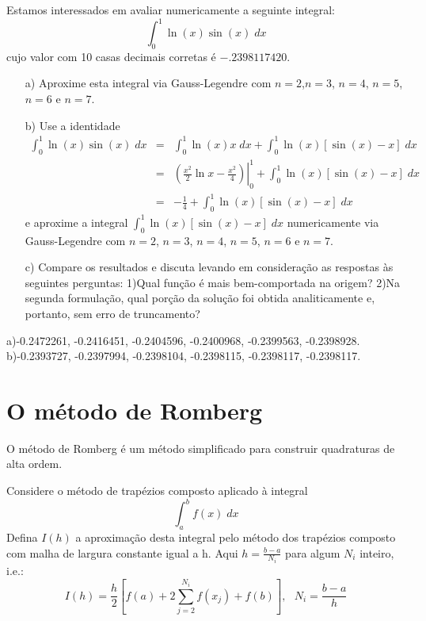 \begin{exer}
Estamos interessados em avaliar numericamente a seguinte integral:
$$\int_0^1 \ln(x)\sin(x)\;dx$$
cujo valor com 10 casas decimais corretas é $-.2398117420$.
\begin{itemize}
\item[a)] Aproxime esta integral via Gauss-Legendre com $n=2$,$n=3$, $n=4$, $n=5$, $n=6$ e $n=7$.
\item[b)] Use a identidade
\begin{eqnarray*}
\int_0^1 \ln(x)\sin(x)\;dx&=&\int_0^1 \ln(x)x\;dx+\int_0^1 \ln(x)\left[\sin(x)-x\right]\;dx\\
&=&\left.\left(\frac{x^2}{2}\ln x-\frac{x^2}{4}\right)\right|_0^1+\int_0^1 \ln(x)\left[\sin(x)-x\right]\;dx\\
&=&-\frac{1}{4}+\int_0^1 \ln(x)\left[\sin(x)-x\right]\;dx
\end{eqnarray*}
e aproxime a integral $\int_0^1 \ln(x)\left[\sin(x)-x\right]\;dx$ numericamente via Gauss-Legendre com $n=2$, $n=3$, $n=4$, $n=5$, $n=6$ e $n=7$.
\item[c)] Compare os resultados e discuta levando em consideração as respostas às seguintes perguntas: 1)Qual função é mais bem-comportada na origem? 2)Na segunda formulação, qual porção da solução foi obtida analiticamente e, portanto, sem erro de truncamento?
\end{itemize}
\end{exer}
\begin{resp}
  
    a)-0.2472261,  -0.2416451,  -0.2404596,  -0.2400968,  -0.2399563,  -0.2398928.
    b)-0.2393727,  -0.2397994,  -0.2398104,  -0.2398115,  -0.2398117,  -0.2398117.  
  
\end{resp}

\section{O método de Romberg}
O método de Romberg é um método simplificado para construir quadraturas de alta ordem.

Considere o método de trapézios composto aplicado à integral
$$\int_a^bf(x)\;dx$$
Defina $I(h)$ a aproximação desta integral pelo método dos trapézios composto com  malha de largura constante igual a h. Aqui $h=\frac{b-a}{N_i}$ para algum $N_i$ inteiro, i.e.:
$$I(h)=\frac{h}{2}\left[f(a)+2\sum_{j=2}^{N_i} f(x_j)+ f(b)\right],~~~N_i=\frac{b-a}{h}$$

